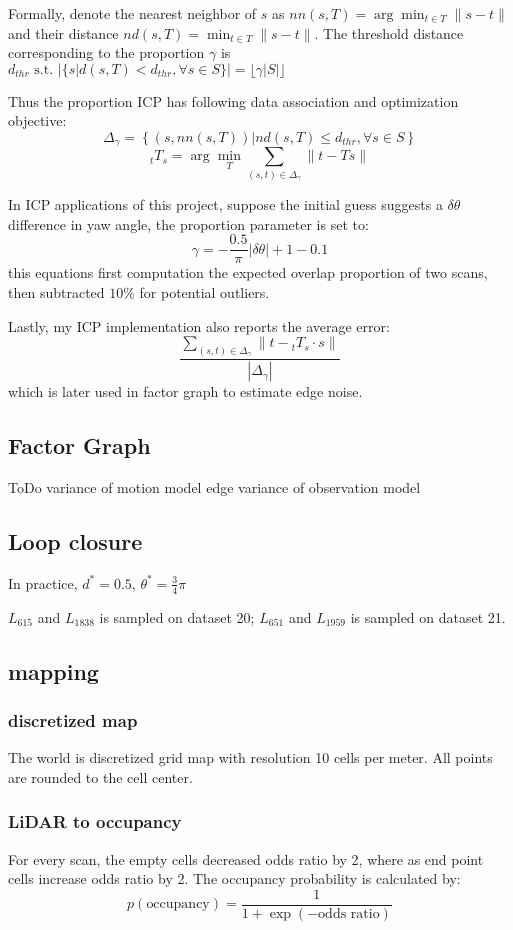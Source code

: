\documentclass[conference]{IEEEtran}
\begin{document}
Formally, denote the nearest neighbor of $s$ as $nn(s, T) = \arg\min_{t \in T} \|s - t\|$ 
and their distance $nd(s, T) = \min_{t \in T} \|s - t\|$.
The threshold distance corresponding to the proportion $\gamma$ is 
$d_{thr} \text{ s.t. } |\{s | d(s, T) < d_{thr}, \forall s \in S\}| = \lfloor\gamma |S| \rfloor$

Thus the proportion ICP has following data association and optimization objective:
$$ \Delta_\gamma = \left\{\left(s, nn(s,T) \right) | nd(s,T) \le d_{thr}, \forall s\in S\right\}$$
$$_tT_s = \arg\min_T \sum\limits_{(s,t)\in\Delta_\gamma} \|t - Ts\|$$

In ICP applications of this project,
suppose the initial guess suggests a $\delta\theta$ difference in yaw angle,
the proportion parameter is set to:
$$\gamma = -\frac{0.5}{\pi}|\delta\theta| + 1 - 0.1$$
this equations first computation the expected overlap proportion of two scans, 
then subtracted $10\%$ for potential outliers.

Lastly, my ICP implementation also reports the average error:
$$\frac{\sum\limits_{(s,t)\in\Delta_\gamma} \|t - {}_tT_s\cdot s\|}{|\Delta_\gamma|}$$
which is later used in factor graph to estimate edge noise.

\subsection{Factor Graph}
ToDo
variance of motion model edge
variance of observation model


\subsection{Loop closure}

In practice, 
$d^* = 0.5$, $\theta^* = \frac 3 4 \pi$

$L_{615}$ and $L_{1838}$ is sampled on dataset 20; 
$L_{651}$ and $L_{1959}$ is sampled on dataset 21.



\subsection{mapping}
\subsubsection{discretized map}
The world is discretized grid map with resolution 10 cells per meter.
All points are rounded to the cell center.

\subsubsection{LiDAR to occupancy}
For every scan, the empty cells decreased odds ratio by 2, where as end point cells
increase odds ratio by 2. The occupancy probability is calculated by:
$$
p\left(\text{occupancy}\right) = \frac{1}{1 + \exp\left(- \text{odds ratio}\right)}
$$
\end{document}

